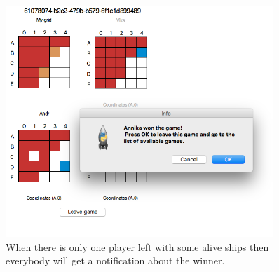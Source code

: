 \documentclass[]{article}
\begin{document}
\begin{figure}[!hbt]
	\centering
	\includegraphics[width=0.9\textwidth]{Winner.png}
	\caption{When there is only one player left with some alive ships then everybody will get a notification about the winner.}
	\label{fig:Winner}
\end{figure}
\end{document}
